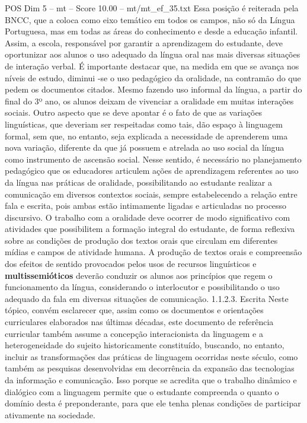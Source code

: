 \begin{textsample}{POS Dim 5 – mt – Score 10.00 – mt/mt\_ef\_35.txt}
Essa posição é reiterada pela BNCC, que a coloca como eixo temático em todos os campos, não só da Língua Portuguesa, mas em todas as áreas do conhecimento e desde a educação infantil.
Assim, a escola, responsável por garantir a aprendizagem do estudante, deve oportunizar aos alunos o uso adequado da língua oral nas mais diversas situações de interação verbal.
É importante destacar que, na medida em que se avança nos níveis de estudo, diminui -se o uso pedagógico da oralidade, na contramão do que pedem os documentos citados.
Mesmo fazendo uso informal da língua, a partir do final do 3º ano, os alunos deixam de vivenciar a oralidade em muitas interações sociais.
Outro aspecto que se deve apontar é o fato de que as variações linguísticas, que deveriam ser respeitadas como tais, dão espaço à linguagem formal, sem que, no entanto, seja explicada a necessidade de aprenderem uma nova variação, diferente da que já possuem e atrelada ao uso social da língua como instrumento de ascensão social.
Nesse sentido, é necessário no planejamento pedagógico que os educadores articulem ações de aprendizagem referentes ao uso da língua nas práticas de oralidade, possibilitando ao estudante realizar a comunicação em diversos contextos sociais, sempre estabelecendo a relação entre fala e escrita, pois ambas estão intimamente ligadas e articuladas no processo discursivo.
O trabalho com a oralidade deve ocorrer de modo significativo com atividades que possibilitem a formação integral do estudante, de forma reflexiva sobre as condições de produção dos textos orais que circulam em diferentes mídias e campos de atividade humana.
A produção de textos orais e compreensão dos efeitos de sentido provocados pelos usos de recursos linguísticos e \textbf{multissemióticos} deverão conduzir os alunos aos princípios que regem o funcionamento da língua, considerando o interlocutor e possibilitando o uso adequado da fala em diversas situações de comunicação. 1.1.2.3.
Escrita Neste tópico, convém esclarecer que, assim como os documentos e orientações curriculares elaborados nas últimas décadas, este documento de referência curricular também assume a concepção interacionista da linguagem e a heterogeneidade do sujeito historicamente constituído, buscando, no entanto, incluir as transformações das práticas de linguagem ocorridas neste século, como também as pesquisas desenvolvidas em decorrência da expansão das tecnologias da informação e comunicação.
Isso porque se acredita que o trabalho dinâmico e dialógico com a linguagem permite que o estudante compreenda o quanto o domínio desta é preponderante, para que ele tenha plenas condições de participar ativamente na sociedade.

\end{textsample}
